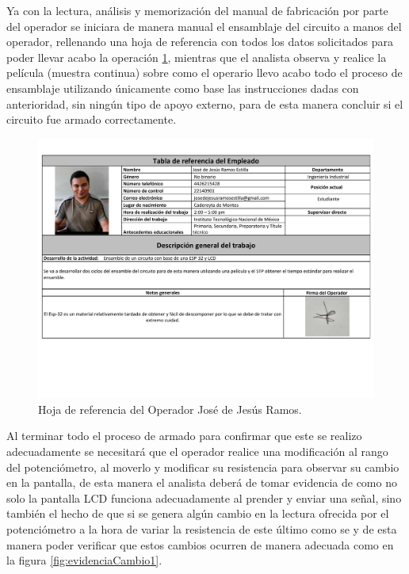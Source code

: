     Ya con la lectura, análisis y memorización del manual de fabricación por parte del operador se iniciara de manera manual el ensamblaje del circuito a manos del operador, rellenando una hoja de referencia con todos los datos solicitados para poder llevar acabo la operación \ref{fig:tablaOperador}, mientras que el analista observa y realice la película (muestra continua) sobre como el operario llevo acabo todo el proceso de ensamblaje utilizando únicamente como base las instrucciones dadas con anterioridad, sin ningún tipo de apoyo externo, para de esta manera concluir si el circuito fue armado correctamente.
\begin{figure}[H]
    \centering
    \includegraphics[trim = {1mm 50mm 1mm 1mm},clip,scale=0.3]{19/Img/tablaOperador.pdf}
    \caption{Hoja de referencia del Operador José de Jesús Ramos.}
    \label{fig:tablaOperador}
\end{figure}
    Al terminar todo el proceso de armado para confirmar que este se realizo adecuadamente se necesitará que el operador realice una modificación al rango del potenciómetro, al moverlo y modificar su resistencia para observar su cambio en la pantalla, de esta manera el analista deberá de tomar evidencia de como no solo la pantalla LCD funciona adecuadamente al prender y enviar una señal, sino también el hecho de que si se genera algún cambio en la lectura ofrecida por el potenciómetro a la hora de variar la resistencia de este último como se y de esta manera poder verificar que estos cambios ocurren de manera adecuada como en la figura \ref{fig:evidenciaCambio1}.
